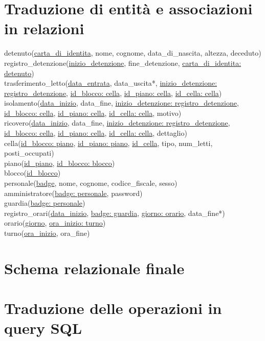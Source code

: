 \documentclass[a4paper,12pt]{report}
\begin{document}
\section{Traduzione di entità e associazioni in relazioni}
detenuto(\underline{carta\_di\_identita}, nome, cognome, data\_di\_nascita, altezza, deceduto)
\\
registro\_detenzione(\underline{inizio\_detenzione}, fine\_detenzione, \underline{carta\_di\_identita: detenuto})
\\
trasferimento\_letto(\underline{data\_entrata}, data\_uscita*, \underline{inizio\_detenzione: registro\_detenzione}, \underline{id\_blocco: cella}, \underline{id\_piano: cella}, \underline{id\_cella: cella})
\\
isolamento(\underline{data\_inizio}, data\_fine, \underline{inizio\_detenzione: registro\_detenzione}, \underline{id\_blocco: cella}, \underline{id\_piano: cella}, \underline{id\_cella: cella}, motivo)
\\
ricovero(\underline{data\_inizio}, data\_fine, \underline{inizio\_detenzione: registro\_detenzione}, \underline{id\_blocco: cella}, \underline{id\_piano: cella}, \underline{id\_cella: cella}, dettaglio)
\\
cella(\underline{id\_blocco: piano}, \underline{id\_piano: piano}, \underline{id\_cella}, tipo, num\_letti, posti\_occupati)
\\
piano(\underline{id\_piano}, \underline{id\_blocco: blocco})
\\
blocco(\underline{id\_blocco})
\\
personale(\underline{badge}, nome, cognome, codice\_fiscale, sesso)
\\
amministratore(\underline{badge: personale}, password)
\\
guardia(\underline{badge: personale})
\\
registro\_orari(\underline{data\_inizio}, \underline{badge: guardia}, \underline{giorno: orario}, data\_fine*)
\\
orario(\underline{giorno}, \underline{ora\_inizio: turno})
\\
turno(\underline{ora\_inizio}, ora\_fine)
\section{Schema relazionale finale}

\section{Traduzione delle operazioni in query SQL}
\end{document}
